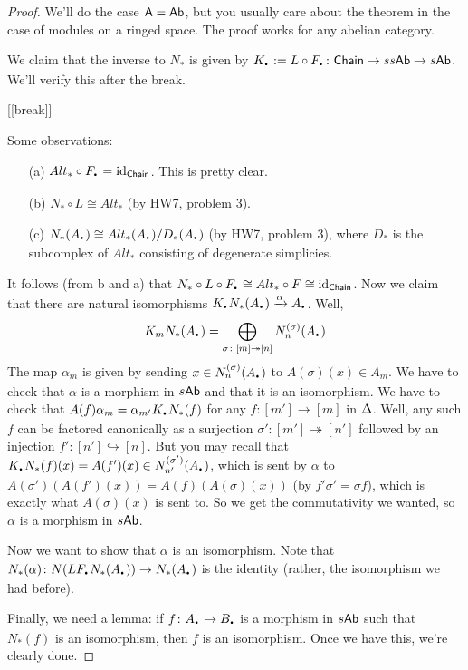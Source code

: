 \begin{proof}
 We'll do the case $\text{\sf A}=\text{\sf Ab}$, but you usually care about the theorem in the case of modules on a ringed space. The proof works for any abelian category.
 
 We claim that the inverse to $N_*$ is given by $K_\udot:= L\circ F_\udot\colon \chain \to ss\ab\to s\ab$. We'll verify this after the break.
 
 [[break]]
 
 Some observations:
 \begin{itemize}
  \item[(a)] $Alt_*\circ F_\udot=\id_\chain$. This is pretty clear.
  \item[(b)] $N_*\circ L\cong Alt_*$ (by HW7, problem 3).
  \item[(c)] $N_*(A_\udot) \cong Alt_*(A_\udot)/D_*(A_\udot)$ (by HW7, problem 3), where $D_*$ is the subcomplex of $Alt_*$ consisting of degenerate simplicies.
 \end{itemize}
 It follows (from b and a) that $N_*\circ L\circ F_\udot\cong Alt_*\circ F\cong \id_\chain$. Now we claim that there are natural isomorphisms $K_\udot N_*(A_\udot)\xrightarrow\alpha A_\udot$. Well, 
 \[
  K_mN_*(A_\udot) = \bigoplus_{\sigma\colon [m]\twoheadrightarrow [n]} N_n^{(\sigma)}(A_\udot)
 \]
The map $\alpha_m$ is given by sending $x\in N^{(\sigma)}_n(A_\udot)$ to $A(\sigma)(x)\in A_m$. We have to check that $\alpha$ is a morphism in $s\text{\sf Ab}$ and that it is an isomorphism. We have to check that $A(f)\alpha_m=\alpha_{m'} K_\udot N_*(f)$ for any $f\colon [m']\to [m]$ in $\Delta$. Well, any such $f$ can be factored canonically as a surjection $\sigma'\colon [m']\twoheadrightarrow [n']$ followed by an injection $f'\colon [n']\hookrightarrow [n]$. But you may recall that $K_\udot N_*(f)(x)=A(f')(x)\in N^{(\sigma')}_{n'}(A_\udot)$, which is sent by $\alpha$ to $A(\sigma')(A(f')(x))=A(f)(A(\sigma)(x))$ (by $f'\sigma'=\sigma f$), which is exactly what $A(\sigma)(x)$ is sent to. So we get the commutativity we wanted, so $\alpha$ is a morphism in $s\text{\sf Ab}$.

Now we want to show that $\alpha$ is an isomorphism. Note that $N_*(\alpha)\colon N(L F_\udot N_*(A_\udot))\to N_*(A_\udot)$ is the identity (rather, the isomorphism we had before).

Finally, we need a lemma: if $f\colon A_\udot\to B_\udot$ is a morphism in $s\text{\sf Ab}$ such that $N_*(f)$ is an isomorphism, then $f$ is an isomorphism. Once we have this, we're clearly done.


\end{proof}
